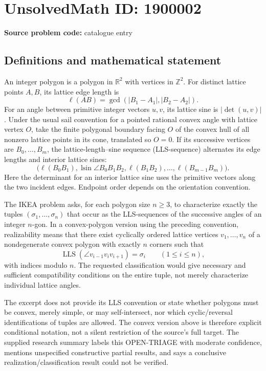 \documentclass[11pt]{article}
\newcommand{\Z}{\mathbb{Z}}
\newcommand{\R}{\mathbb{R}}
\begin{document}
\section*{UnsolvedMath ID: 1900002}
\textbf{Source problem code:} catalogue entry
\subsection{Definitions and mathematical statement}
An integer polygon is a polygon in \(\R^2\) with vertices in \(\Z^2\). For distinct lattice points \(A,B\), its lattice edge length is
\[
\ell(AB)=\gcd(|B_1-A_1|,|B_2-A_2|).
\]
For an angle between primitive integer vectors \(u,v\), its lattice sine is \(|\det(u,v)|\). Under the usual sail convention for a pointed rational convex angle with lattice vertex \(O\), take the finite polygonal boundary facing \(O\) of the convex hull of all nonzero lattice points in its cone, translated so \(O=0\). If its successive vertices are \(B_0,\ldots,B_m\), the lattice-length--sine sequence (LLS-sequence) alternates its edge lengths and interior lattice sines:
\[
\bigl(\ell(B_0B_1),\operatorname{lsin}\angle B_0B_1B_2,
\ell(B_1B_2),\ldots,\ell(B_{m-1}B_m)\bigr).
\]
Here the determinant for an interior lattice sine uses the primitive vectors along the two incident edges. Endpoint order depends on the orientation convention.

The IKEA problem asks, for each polygon size \(n\ge3\), to characterize exactly the tuples \((\sigma_1,\ldots,\sigma_n)\) that occur as the LLS-sequences of the successive angles of an integer \(n\)-gon. In a convex-polygon version using the preceding convention, realizability means that there exist cyclically ordered lattice vertices \(v_1,\ldots,v_n\) of a nondegenerate convex polygon with exactly \(n\) corners such that
\[
\operatorname{LLS}(\angle v_{i-1}v_iv_{i+1})=\sigma_i
\qquad(1\le i\le n),
\]
with indices modulo \(n\). The requested classification would give necessary and sufficient compatibility conditions on the entire tuple, not merely characterize individual lattice angles.

The excerpt does not provide its LLS convention or state whether polygons must be convex, merely simple, or may self-intersect, nor which cyclic/reversal identifications of tuples are allowed. The convex version above is therefore explicit conditional notation, not a silent restriction of the source's full target. The supplied research summary labels this OPEN-TRIAGE with moderate confidence, mentions unspecified constructive partial results, and says a conclusive realization/classification result could not be verified.
\end{document}
